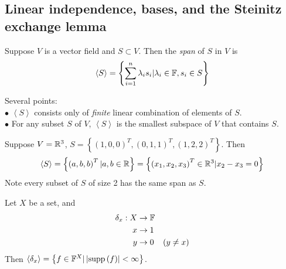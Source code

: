 \documentclass[a4paper]{article}
\begin{document}
\subsection{Linear independence, bases, and the Steinitz exchange lemma}

\begin{defi}
Suppose $V$ is a vector field and $S \subset V$. Then the \emph{span} of $S$ in $V$ is
\begin{equation*}
\begin{aligned}
\left<S\right> = \left\{\sum_{i=1}^n \lambda_i s_i | \lambda_i \in \mathbb{F}, s_i \in S\right\}
\end{aligned}
\end{equation*}
\end{defi}

\begin{rem} Several points:\\
$\bullet$ $\left<S\right>$ consists only of \emph{finite} linear combination of elements of $S$.\\
$\bullet$ For any subset $S$ of $V$, $\left<S\right>$ is the smallest subspace of $V$ that contains $S$.
\end{rem}

\begin{eg}
Suppose $V=\mathbb{R}^3$, $S=\left\{\left(1,0,0\right)^T,\left(0,1,1\right)^T,\left(1,2,2\right)^T\right\}$. Then
\begin{equation*}
\begin{aligned}
\left<S\right> = \left\{ \left(a,b,b\right)^T | a,b\in \mathbb{R}\right\} = \left\{ \left(x_1,x_2,x_3\right)^T\in\mathbb{R}^3 | x_2 - x_3 = 0\right\}
\end{aligned}
\end{equation*}
Note every subset of $S$ of size 2 has the same span as $S$.
\end{eg}

\begin{eg}
Let $X$ be a set, and
\begin{equation*}
\begin{aligned}
\delta_x: X &\to \mathbb{F}&\\
x &\to 1&\\
y &\to 0& \left(y\neq x\right)
\end{aligned}
\end{equation*}
Then $\left<\delta_x\right> = \left\{f\in \mathbb{F}^X | \left|\text{supp}\left(f\right)\right| < \infty\right\}$.
\end{eg}
\end{document}
